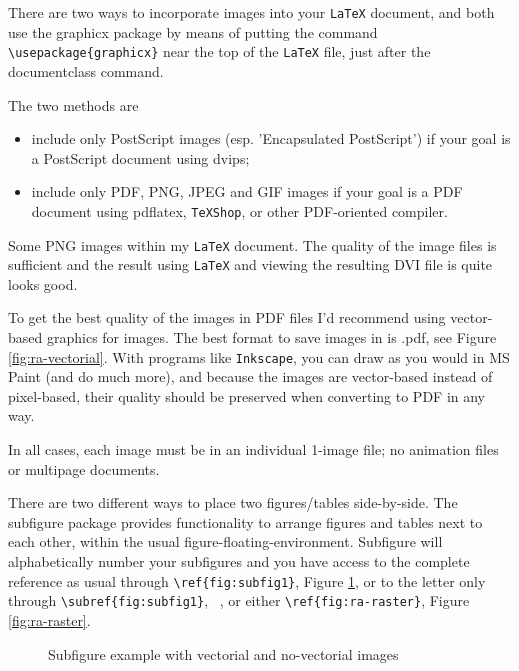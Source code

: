 \begin{sloppypar}
There are two ways to incorporate images into your \texttt{LaTeX} document, and both use the graphicx package by means of putting the command  \verb!\usepackage{graphicx}!  near the top of the \texttt{LaTeX} file, just after the documentclass command.
\end{sloppypar}

The two methods are

\begin{itemize}
\item  include only PostScript images (esp. 'Encapsulated PostScript') if your goal is a PostScript document using dvips;
\item include only PDF, PNG, JPEG and GIF images if your goal is a PDF document using pdflatex, \texttt{TeXShop}, or other PDF-oriented compiler. 
\end{itemize}

Some PNG images within my \texttt{LaTeX} document. The quality of the image files is sufficient and the result using \texttt{LaTeX} and viewing the resulting DVI file is quite looks good.

To get the best quality of the images in  PDF files I'd recommend using vector-based graphics for images. The best format to save images in is .pdf, see Figure \ref{fig:ra-vectorial}. With programs like \texttt{Inkscape}, you can draw as you would in MS Paint (and do much more), and because the images are vector-based instead of pixel-based, their quality should be preserved when converting to PDF in any way.    

In all cases, each image must be in an individual 1-image file; no animation files or multipage documents. 

There are two different ways to place two figures/tables side-by-side. The subfigure package provides functionality to arrange figures and tables next to each other, within the usual figure-floating-environment. Subfigure will alphabetically number your subfigures and you have access to the complete reference as usual through \verb!\ref{fig:subfig1}!, Figure \ref{fig:figura-completa}, or to the letter only through \verb!\subref{fig:subfig1}!, ~, or either \verb!\ref{fig:ra-raster}!, Figure \ref{fig:ra-raster}.

\begin{figure}[htbp]
	\centering
\qquad\qquad
  \caption{Subfigure example with vectorial and no-vectorial images}
  \label{fig:figura-completa}
\end{figure}


